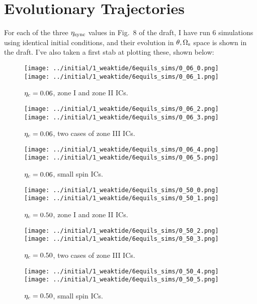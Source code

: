 \documentclass[11pt,
        usenames, %
        dvipsnames %
    ]{article}
\begin{document}
\section{Evolutionary Trajectories}

For each of the three $\eta_{\rm sync}$ values in Fig.~8 of the draft, I have
run 6 simulations using identical initial conditions, and their evolution in
$\theta, \Omega_{\rm s}$ space is shown in the draft. I've also taken a first
stab at plotting these, shown below:
\begin{figure}
    \centering
    \texttt{[image: ../initial/1\_weaktide/6equils\_sims/0\_06\_0.png]}
    \texttt{[image: ../initial/1\_weaktide/6equils\_sims/0\_06\_1.png]}
    \caption{$\eta_{\rm c} = 0.06$, zone I and zone II ICs.}
\end{figure}
\begin{figure}
    \centering
    \texttt{[image: ../initial/1\_weaktide/6equils\_sims/0\_06\_2.png]}
    \texttt{[image: ../initial/1\_weaktide/6equils\_sims/0\_06\_3.png]}
    \caption{$\eta_{\rm c} = 0.06$, two cases of zone III ICs.}
\end{figure}
\begin{figure}
    \centering
    \texttt{[image: ../initial/1\_weaktide/6equils\_sims/0\_06\_4.png]}
    \texttt{[image: ../initial/1\_weaktide/6equils\_sims/0\_06\_5.png]}
    \caption{$\eta_{\rm c} = 0.06$, small spin ICs.}
\end{figure}
\begin{figure}
    \centering
    \texttt{[image: ../initial/1\_weaktide/6equils\_sims/0\_50\_0.png]}
    \texttt{[image: ../initial/1\_weaktide/6equils\_sims/0\_50\_1.png]}
    \caption{$\eta_{\rm c} = 0.50$, zone I and zone II ICs.}
\end{figure}
\begin{figure}
    \centering
    \texttt{[image: ../initial/1\_weaktide/6equils\_sims/0\_50\_2.png]}
    \texttt{[image: ../initial/1\_weaktide/6equils\_sims/0\_50\_3.png]}
    \caption{$\eta_{\rm c} = 0.50$, two cases of zone III ICs.}
\end{figure}
\begin{figure}
    \centering
    \texttt{[image: ../initial/1\_weaktide/6equils\_sims/0\_50\_4.png]}
    \texttt{[image: ../initial/1\_weaktide/6equils\_sims/0\_50\_5.png]}
    \caption{$\eta_{\rm c} = 0.50$, small spin ICs.}
\end{figure}
\end{document}
